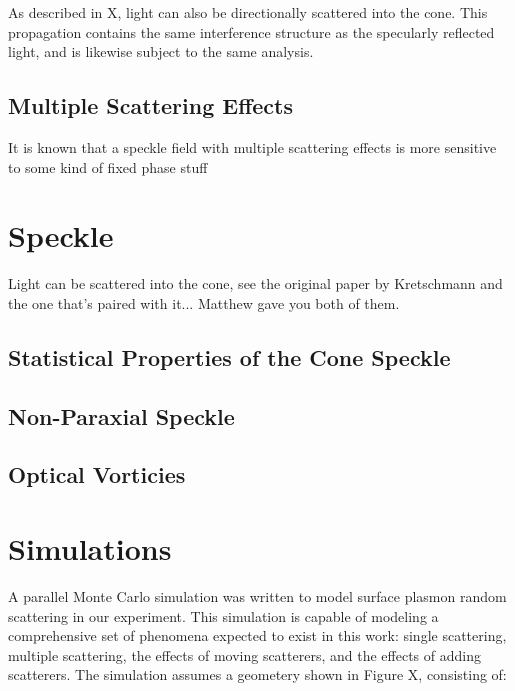 \documentclass[a4paper,titlepage,onecolumn]{report}
\begin{document}
As described in X, light can also be directionally scattered into
the cone. This propagation contains the same interference structure
as the specularly reflected light, and is likewise subject to the
same analysis.


\section{Multiple Scattering Effects}

It is known that a speckle field with multiple scattering effects
is more sensitive to some kind of fixed phase stuff 

\chapter{Speckle}
\label{ch:speckle}

Light can be scattered into the cone, see the original paper by Kretschmann
and the one that's paired with it... Matthew gave you both of them.

\section{Statistical Properties of the Cone Speckle}

\section{Non-Paraxial Speckle}


\section{Optical Vorticies}


\chapter{Simulations}
\label{ch:simulations}
A parallel Monte Carlo simulation was written to model surface plasmon
random scattering in our experiment. This simulation is capable of modeling
a comprehensive set of phenomena expected to exist in this work: single
scattering, multiple scattering, the effects of moving scatterers, and the
effects of adding scatterers. The simulation assumes a geometery shown in
Figure X, consisting of:
\end{document}
